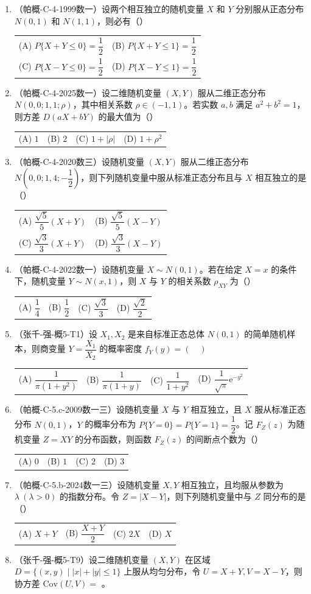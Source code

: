 \documentclass[12pt,a4paper]{ctexart}
\makeatletter
\newcommand{\optfour}[4]{\par\begin{tabularx}{\linewidth}{@{}X@{\quad}X@{\quad}X@{\quad}X@{}}#1&#2&#3&#4\end{tabularx}}
\newcommand{\opttwo}[4]{\par\begin{tabularx}{\linewidth}{@{}X@{\quad}X@{}}#1&#2\\[0.8em]#3&#4\end{tabularx}}
\makeatother
\begin{document}
\begin{enumerate}[label=\arabic*.]
\item（帕概-C-4-1999数一）设两个相互独立的随机变量 $X$ 和 $Y$ 分别服从正态分布 $N(0, 1)$ 和 $N(1, 1)$，则必有（\quad）
\opttwo{(A) $P\{X + Y \leqslant 0\} = \dfrac{1}{2}$}{(B) $P\{X + Y \leqslant 1\} = \dfrac{1}{2}$}{(C) $P\{X - Y \leqslant 0\} = \dfrac{1}{2}$}{(D) $P\{X - Y \leqslant 1\} = \dfrac{1}{2}$}

\item（帕概-C-4-2025数一）设二维随机变量 $(X, Y)$ 服从二维正态分布 $N(0, 0; 1, 1; \rho)$，其中相关系数 $\rho \in (-1, 1)$。若实数 $a, b$ 满足 $a^{2} + b^{2} = 1$，则方差 $D(aX + bY)$ 的最大值为（\quad）
\optfour{(A) $1$}{(B) $2$}{(C) $1 + |\rho|$}{(D) $1 + \rho^{2}$}

\item（帕概-C-4-2020数三）设随机变量 $(X, Y)$ 服从二维正态分布 $N\left(0, 0; 1, 4; -\dfrac{1}{2}\right)$，则下列随机变量中服从标准正态分布且与 $X$ 相互独立的是（\quad）
\opttwo{(A) $\dfrac{\sqrt{5}}{5}(X + Y)$}{(B) $\dfrac{\sqrt{5}}{5}(X - Y)$}{(C) $\dfrac{\sqrt{3}}{3}(X + Y)$}{(D) $\dfrac{\sqrt{3}}{3}(X - Y)$}

\item（帕概-C-4-2022数一）设随机变量 $X \sim N(0, 1)$。若在给定 $X = x$ 的条件下，随机变量 $Y \sim N(x, 1)$，则 $X$ 与 $Y$ 的相关系数 $\rho_{XY}$ 为（\quad）
\optfour{(A) $\dfrac{1}{4}$}{(B) $\dfrac{1}{2}$}{(C) $\dfrac{\sqrt{3}}{3}$}{(D) $\dfrac{\sqrt{2}}{2}$}

\item（张千-强-概5-T1）设 $X_{1}, X_{2}$ 是来自标准正态总体 $N(0, 1)$ 的简单随机样本，则商变量 $Y = \dfrac{X_{1}}{X_{2}}$ 的概率密度 $f_{Y}(y) = (\quad)$
\optfour{(A) $\dfrac{1}{\pi(1 + y^{2})}$}{(B) $\dfrac{1}{\pi(1 + y)}$}{(C) $\dfrac{1}{1 + y^{2}}$}{(D) $\dfrac{1}{\sqrt{\pi}} \mathrm{e}^{-y^{2}}$}

\item（帕概-C-5.c-2009数一三）设随机变量 $X$ 与 $Y$ 相互独立，且 $X$ 服从标准正态分布 $N(0, 1)$，$Y$ 的概率分布为 $P\{Y = 0\} = P\{Y = 1\} = \dfrac{1}{2}$。记 $F_{Z}(z)$ 为随机变量 $Z = XY$ 的分布函数，则函数 $F_{Z}(z)$ 的间断点个数为（\quad）
\optfour{(A) $0$}{(B) $1$}{(C) $2$}{(D) $3$}

\item（帕概-C-5.b-2024数一三）设随机变量 $X, Y$ 相互独立，且均服从参数为 $\lambda\ (\lambda > 0)$ 的指数分布。令 $Z = |X - Y|$，则下列随机变量中与 $Z$ 同分布的是（\quad）
\optfour{(A) $X + Y$}{(B) $\dfrac{X + Y}{2}$}{(C) $2X$}{(D) $X$}

\item（张千-强-概5-T9）设二维随机变量 $(X, Y)$ 在区域 $D = \{(x, y) \mid |x| + |y| \leqslant 1\}$ 上服从均匀分布，令 $U = X + Y, V = X - Y$，则协方差 $\mathrm{Cov}(U, V) = $ \underline{\hspace{5em}}。


\end{enumerate}
\end{document}
